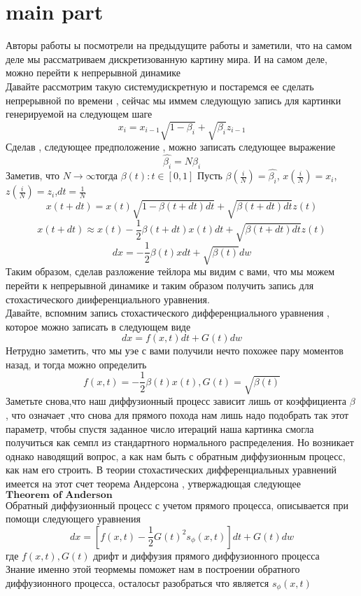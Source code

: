 \section{main part}
Авторы работы ы \cite{Sde} посмотрели на предыдущите работы и заметили, что на самом деле мы рассматриваем дискретизованную картину мира. И на самом деле, можно перейти к непрерывной динамике
\\[0.2 cm]
Давайте рассмотрим такую системудискретную и постаремся ее сделать непрерывной по времени , сейчас мы иммем следующую запись для картинки генерируемой на следующем шаге
$$ x_{i} = x_{i-1} \sqrt{1 - \beta_{i}} + \sqrt{\beta_{i}}z_{i-1} $$
Сделав , следующее предположение , можно записать следующее выражение
$$ \hat{\beta_{i}} = N \beta_{i} $$
Заметив, что  $N \to \infty$тогда $\beta(t) : t \in [0,1]$
\vspace{5pt}
Пусть $\beta(\frac{i}{N}) = \hat{\beta_{i}}$,  $x(\frac{i}{N}) = x_{i}$, $z(\frac{i}{N}) = z_{i}$,$  dt = \frac{1}{N}$
$$ x(t +  dt) = x(t) \sqrt{1 - \beta(t + dt)dt} + \sqrt{\beta(t + dt)dt}z(t)  $$
$$ x(t + dt) \approx x(t) - \frac{1}{2} \beta(t + dt) x(t) dt  + \sqrt{\beta(t +dt)dt}z(t)$$
$$ dx = - \frac{1}{2} \beta(t)x dt  + \sqrt{\beta(t)}dw$$
Таким образом, сделав разложение тейлора мы видим с вами, что мы можем перейти к непрерывной динамике и таким образом получить запись для стохастического дииференциального уравнения.
\\[0.2 cm]
Давайте, вспомним запись стохастического дифференциального уравнения , которое можно записать в следующем виде
$$ dx = f(x,t)dt + G(t)dw $$
Нетрудно заметить, что мы уэе с вами получили нечто похожее пару моментов назад, и тогда можно определить
$$ f(x,t) = -\frac{1}{2}\beta(t)x(t), G(t) = \sqrt{\beta(t)} $$
Заметьте снова,что наш диффузионный процесс зависит лишь от коэффициента $\beta$  , что означает ,что снова для прямого похода нам лишь надо подобрать так этот параметр, чтобы спустя заданное число итераций наша картинка смогла получиться как семпл из стандартного нормального распределения. Но возникает однако наводящий вопрос, а как нам быть с обратным диффузионным процесс, как нам его строить. В теории стохастических дифференциальных уравнений имеется на этот счет теорема Андерсона , утвержадющая следующее
\\[0.2 cm]

$\textbf{Theorem of Anderson}$
\\[0.1 cm]
Обратный диффузионный процесс с учетом прямого процесса, описывается при помощи следующего уравнения
$$dx = [f(x,t) - \frac{1}{2}G(t)^{2}s_{\phi}(x,t)]dt  + G(t)dw $$
где $f(x,t) , G(t)$ дрифт и диффузия прямого диффузионного процесса
\\[0.3 cm]
Знание именно этой теормемы поможет нам в построении обратного диффузионного процесса, осталосьт разобраться что является 
 $s_{\phi}(x,t)$
 
